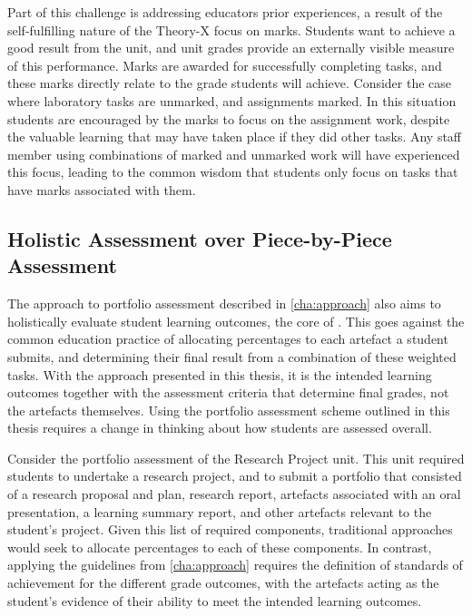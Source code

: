 Part of this challenge is addressing educators prior experiences, a result of the self-fulfilling nature of the Theory-X focus on marks. Students want to achieve a good result from the unit, and unit grades provide an externally visible measure of this performance. Marks are awarded for successfully completing tasks, and these marks directly relate to the grade students will achieve. Consider the case where laboratory tasks are unmarked, and assignments marked. In this situation students are encouraged by the marks to focus on the assignment work, despite the valuable learning that may have taken place if they did other tasks. Any staff member using combinations of marked and unmarked work will have experienced this focus, leading to the common wisdom that students only focus on tasks that have marks associated with them.


\subsection{Holistic Assessment over Piece-by-Piece Assessment} %
\label{sub:holistic_assessment_over_piece_by_piece_assessment}

The approach to portfolio assessment described in \cref{cha:approach} also aims to holistically evaluate student learning outcomes, the core of . This goes against the common education practice of allocating percentages to each artefact a student submits, and determining their final result from a combination of these weighted tasks. With the approach presented in this thesis, it is the intended learning outcomes together with the assessment criteria that determine final grades, not the artefacts themselves. Using the portfolio assessment scheme outlined in this thesis requires a change in thinking about how students are assessed overall.

Consider the portfolio assessment of the Research Project unit. This unit required students to undertake a research project, and to submit a portfolio that consisted of a research proposal and plan, research report, artefacts associated with an oral presentation, a learning summary report, and other artefacts relevant to the student's project. Given this list of required components, traditional approaches would seek to allocate percentages to each of these components. In contrast, applying the guidelines from \cref{cha:approach} requires the definition of standards of achievement for the different grade outcomes, with the artefacts acting as the student's evidence of their ability to meet the intended learning outcomes.

